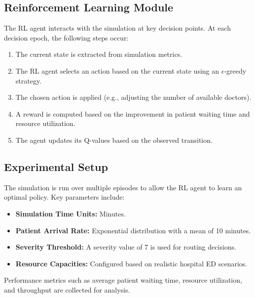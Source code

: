 \documentclass[12pt]{article}
\begin{document}
\subsection{Reinforcement Learning Module}
The RL agent interacts with the simulation at key decision points. At each decision epoch, the following steps occur:
\begin{enumerate}[noitemsep]
    \item The current state is extracted from simulation metrics.
    \item The RL agent selects an action based on the current state using an $\epsilon$-greedy strategy.
    \item The chosen action is applied (e.g., adjusting the number of available doctors).
    \item A reward is computed based on the improvement in patient waiting time and resource utilization.
    \item The agent updates its Q-values based on the observed transition.
\end{enumerate}

\subsection{Experimental Setup}
The simulation is run over multiple episodes to allow the RL agent to learn an optimal policy. Key parameters include:
\begin{itemize}[noitemsep]
    \item \textbf{Simulation Time Units:} Minutes.
    \item \textbf{Patient Arrival Rate:} Exponential distribution with a mean of 10 minutes.
    \item \textbf{Severity Threshold:} A severity value of 7 is used for routing decisions.
    \item \textbf{Resource Capacities:} Configured based on realistic hospital ED scenarios.
\end{itemize}
Performance metrics such as average patient waiting time, resource utilization, and throughput are collected for analysis.
\end{document}
